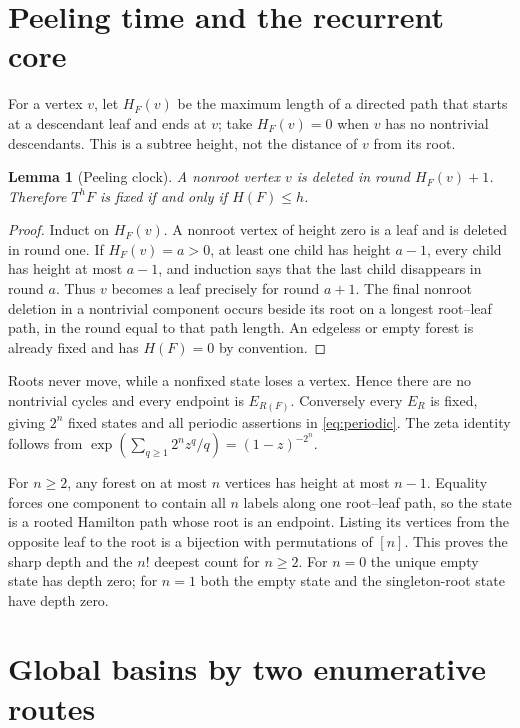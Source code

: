 \documentclass[10pt,a4paper]{amsart}
\newtheorem{lemma}[theorem]{Lemma}
\theoremstyle{definition}
\begin{document}
\section{Peeling time and the recurrent core}

For a vertex $v$, let $H_F(v)$ be the maximum length of a directed path that
starts at a descendant leaf and ends at $v$; take $H_F(v)=0$ when $v$ has no
nontrivial descendants.  This is a subtree height, not the distance of $v$
from its root.

\begin{lemma}[Peeling clock]\label{lem:clock}
A nonroot vertex $v$ is deleted in round $H_F(v)+1$.  Therefore $T^hF$ is
fixed if and only if $H(F)\leq h$.
\end{lemma}

\begin{proof}
Induct on $H_F(v)$.  A nonroot vertex of height zero is a leaf and is deleted
in round one.  If $H_F(v)=a>0$, at least one child has height $a-1$, every
child has height at most $a-1$, and induction says that the last child
disappears in round $a$.  Thus $v$ becomes a leaf precisely for round $a+1$.
The final nonroot deletion in a nontrivial component occurs beside its root
on a longest root--leaf path, in the round equal to that path length.  An
edgeless or empty forest is already fixed and has $H(F)=0$ by convention.
\end{proof}

Roots never move, while a nonfixed state loses a vertex.  Hence there are no
nontrivial cycles and every endpoint is $E_{R(F)}$.  Conversely every
$E_R$ is fixed, giving $2^n$ fixed states and all periodic assertions in
\eqref{eq:periodic}.  The zeta identity follows from
$\exp(\sum_{q\geq1}2^nz^q/q)=(1-z)^{-2^n}$.

For $n\geq2$, any forest on at most $n$ vertices has height at most $n-1$.
Equality forces
one component to contain all $n$ labels along one root--leaf path, so the
state is a rooted Hamilton path whose root is an endpoint.  Listing its
vertices from the opposite leaf to the root is a bijection with permutations
of $[n]$.  This proves the sharp depth and the $n!$ deepest count for
$n\geq2$.  For $n=0$ the unique empty state has depth zero; for $n=1$ both
the empty state and the singleton-root state have depth zero.

\section{Global basins by two enumerative routes}
\end{document}
